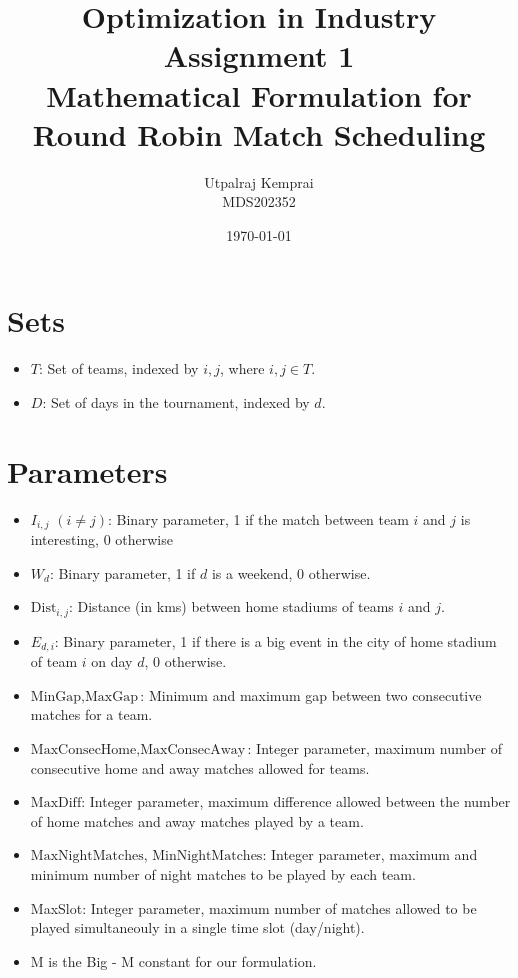 \documentclass[a4paper, 12pt]{article}
\title{Optimization in Industry Assignment 1 \\ Mathematical Formulation for Round Robin Match Scheduling}
\author{Utpalraj Kemprai \\ MDS202352}
\date{\today}
\begin{document}
\maketitle

\section*{Sets}
\begin{itemize}
    \item $T$: Set of teams, indexed by $i, j$, where $i, j \in T$.
    \item $D$: Set of days in the tournament, indexed by $d$.
\end{itemize}

\section*{Parameters}
\begin{itemize}
    \item $I_{i,j}$ $(i \neq j)$: Binary parameter, 1 if the match between team $i$ and $j$ is interesting, 0 otherwise
    \item $W_{d}$: Binary parameter, 1 if $d$ is a weekend, 0 otherwise.
    \item $\text{Dist}_{i,j}$: Distance (in kms) between home stadiums of teams $i$ and $j$.
    \item $E_{d,i}$: Binary parameter, 1 if there is a big event in the city of home stadium of team $i$ on day $d$, 0 otherwise.
    \item $\text{MinGap}, \text{MaxGap}$: Minimum and maximum gap between two consecutive matches for a team.
    \item $\text{MaxConsecHome},\text{MaxConsecAway}$: Integer parameter, maximum number of consecutive home and away matches allowed for teams.
    \item $\text{MaxDiff}$: Integer parameter, maximum difference allowed between the number of home matches and away matches played by a team.
    \item $\text{MaxNightMatches}$, $\text{MinNightMatches}$: Integer parameter, maximum and minimum number of night matches to be played by each team.
    \item MaxSlot: Integer parameter, maximum number of matches allowed to be played simultaneouly in a single time slot (day/night).
    \item M is the Big - M constant for our formulation.
\end{itemize}
\end{document}
